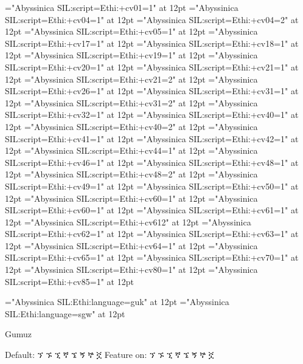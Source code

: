 \font\OTone="Abyssinica SIL:script=Ethi:+cv01=1" at 12pt
\font\OTfourone="Abyssinica SIL:script=Ethi:+cv04=1" at 12pt
\font\OTfourtwo="Abyssinica SIL:script=Ethi:+cv04=2" at 12pt 
\font\OTfive="Abyssinica SIL:script=Ethi:+cv05=1" at 12pt
\font\OTseventeen="Abyssinica SIL:script=Ethi:+cv17=1" at 12pt 
\font\OTeighteen="Abyssinica SIL:script=Ethi:+cv18=1" at 12pt 
\font\OTnineteen="Abyssinica SIL:script=Ethi:+cv19=1" at 12pt
\font\OTtwenty="Abyssinica SIL:script=Ethi:+cv20=1" at 12pt 
\font\OTtwentyoneone="Abyssinica SIL:script=Ethi:+cv21=1" at 12pt
\font\OTtwentyonetwo="Abyssinica SIL:script=Ethi:+cv21=2" at 12pt 
\font\OTtwentysix="Abyssinica SIL:script=Ethi:+cv26=1" at 12pt
\font\OTthirtyoneone="Abyssinica SIL:script=Ethi:+cv31=1" at 12pt
\font\OTthirtyonetwo="Abyssinica SIL:script=Ethi:+cv31=2" at 12pt 
\font\OTthirtytwo="Abyssinica SIL:script=Ethi:+cv32=1" at 12pt
\font\OTfortyone="Abyssinica SIL:script=Ethi:+cv40=1" at 12pt
\font\OTfortytwo="Abyssinica SIL:script=Ethi:+cv40=2" at 12pt 
\font\OTfortyoneone="Abyssinica SIL:script=Ethi:+cv41=1" at 12pt
\font\OTfortytwoone="Abyssinica SIL:script=Ethi:+cv42=1" at 12pt
\font\OTfortyfive="Abyssinica SIL:script=Ethi:+cv44=1" at 12pt
\font\OTfortysix="Abyssinica SIL:script=Ethi:+cv46=1" at 12pt
\font\OTfortyeightone="Abyssinica SIL:script=Ethi:+cv48=1" at 12pt
\font\OTfortyeighttwo="Abyssinica SIL:script=Ethi:+cv48=2" at 12pt 
\font\OTfortynine="Abyssinica SIL:script=Ethi:+cv49=1" at 12pt
\font\OTfifty="Abyssinica SIL:script=Ethi:+cv50=1" at 12pt
\font\OTsixtyone="Abyssinica SIL:script=Ethi:+cv60=1" at 12pt
\font\OTsixtytwo="Abyssinica SIL:script=Ethi:+cv60=1" at 12pt 
\font\OTsixtyoneone="Abyssinica SIL:script=Ethi:+cv61=1" at 12pt
\font\OTsixtyonetwo="Abyssinica SIL:script=Ethi:+cv61{2}" at 12pt 
\font\OTsixtytwoone="Abyssinica SIL:script=Ethi:+cv62=1" at 12pt
\font\OTsixtythree="Abyssinica SIL:script=Ethi:+cv63=1" at 12pt
\font\OTsixtyfour="Abyssinica SIL:script=Ethi:+cv64=1" at 12pt
\font\OTsixtyfive="Abyssinica SIL:script=Ethi:+cv65=1" at 12pt 
\font\OTseventy="Abyssinica SIL:script=Ethi:+cv70=1" at 12pt
\font\OTeighty="Abyssinica SIL:script=Ethi:+cv80=1" at 12pt
\font\OTeightyfive="Abyssinica SIL:script=Ethi:+cv85=1" at 12pt

\font\guk="Abyssinica SIL:Ethi:language=guk" at 12pt
\font\sgw="Abyssinica SIL:Ethi:language=sgw" at 12pt

\A Gumuz

\IndSS Default: ኘ ኙ ኚ ኛ ኜ ኝ ኞ ኟ
\IndSS\guk Feature on: ኘ ኙ ኚ ኛ ኜ ኝ ኞ ኟ



